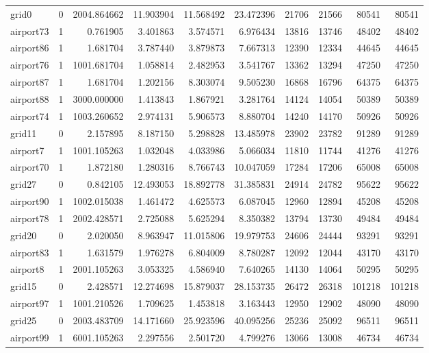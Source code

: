 \begin{longtable}{|l|r|r|r|r|r|r|r|r|r|}
grid0 & 0 & 2004.864662 & 11.903904 & 11.568492 & 23.472396 & 21706 & 21566 & 80541 & 80541 \\
airport73 & 1 & 0.761905 & 3.401863 & 3.574571 & 6.976434 & 13816 & 13746 & 48402 & 48402 \\
airport86 & 1 & 1.681704 & 3.787440 & 3.879873 & 7.667313 & 12390 & 12334 & 44645 & 44645 \\
airport76 & 1 & 1001.681704 & 1.058814 & 2.482953 & 3.541767 & 13362 & 13294 & 47250 & 47250 \\
airport87 & 1 & 1.681704 & 1.202156 & 8.303074 & 9.505230 & 16868 & 16796 & 64375 & 64375 \\
airport88 & 1 & 3000.000000 & 1.413843 & 1.867921 & 3.281764 & 14124 & 14054 & 50389 & 50389 \\
airport74 & 1 & 1003.260652 & 2.974131 & 5.906573 & 8.880704 & 14240 & 14170 & 50926 & 50926 \\
grid11 & 0 & 2.157895 & 8.187150 & 5.298828 & 13.485978 & 23902 & 23782 & 91289 & 91289 \\
airport7 & 1 & 1001.105263 & 1.032048 & 4.033986 & 5.066034 & 11810 & 11744 & 41276 & 41276 \\
airport70 & 1 & 1.872180 & 1.280316 & 8.766743 & 10.047059 & 17284 & 17206 & 65008 & 65008 \\
grid27 & 0 & 0.842105 & 12.493053 & 18.892778 & 31.385831 & 24914 & 24782 & 95622 & 95622 \\
airport90 & 1 & 1002.015038 & 1.461472 & 4.625573 & 6.087045 & 12960 & 12894 & 45208 & 45208 \\
airport78 & 1 & 2002.428571 & 2.725088 & 5.625294 & 8.350382 & 13794 & 13730 & 49484 & 49484 \\
grid20 & 0 & 2.020050 & 8.963947 & 11.015806 & 19.979753 & 24606 & 24444 & 93291 & 93291 \\
airport83 & 1 & 1.631579 & 1.976278 & 6.804009 & 8.780287 & 12092 & 12044 & 43170 & 43170 \\
airport8 & 1 & 2001.105263 & 3.053325 & 4.586940 & 7.640265 & 14130 & 14064 & 50295 & 50295 \\
grid15 & 0 & 2.428571 & 12.274698 & 15.879037 & 28.153735 & 26472 & 26318 & 101218 & 101218 \\
airport97 & 1 & 1001.210526 & 1.709625 & 1.453818 & 3.163443 & 12950 & 12902 & 48090 & 48090 \\
grid25 & 0 & 2003.483709 & 14.171660 & 25.923596 & 40.095256 & 25236 & 25092 & 96511 & 96511 \\
airport99 & 1 & 6001.105263 & 2.297556 & 2.501720 & 4.799276 & 13066 & 13008 & 46734 & 46734 \\

\end{longtable}
